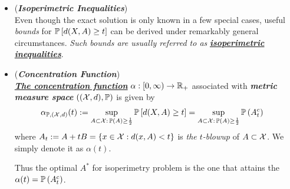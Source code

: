 \documentclass[11pt]{article}
\begin{document}
\begin{itemize}
\item \begin{remark} (\emph{\textbf{Isoperimetric Inequalities}})\\
Even though the exact solution is only known in a few special cases, useful \emph{bounds} for ${\mathbb P}\left[d(X, A) \ge t\right]$ can be derived under remarkably general circumstances. \emph{Such bounds are usually referred to as} \underline{\emph{\textbf{isoperimetric inequalities}}}.
\end{remark}

\item \begin{definition} (\textbf{\emph{Concentration Function}}) \citep{boucheron2013concentration, wainwright2019high}\\
\underline{\emph{\textbf{The concentration function}}} $\alpha: [0, \infty) \to {\mathbb R}_{+}$  associated with \emph{\textbf{metric measure space}} $(({\mathcal X}, d), {\mathbb P})$ is given by
\begin{align*}
\alpha_{{\mathbb P}, ({\mathcal X}, d)}(t) &:= \sup_{ A \subset {\mathcal X}:\, {\mathbb P}\left(A\right) \ge \frac{1}{2}}{\mathbb P}\left[d(X, A) \ge t \right] = \sup_{A \subset {\mathcal X}: \,{\mathbb P}\left(A\right) \ge \frac{1}{2}}{\mathbb P}\left(A_{t}^{c} \right)
\end{align*} where $A_t:= A + tB = \left\{x \in {\mathcal X}: d(x, A) < t\right\}$ is \emph{the $t$-blowup} of $A \subset {\mathcal X}$. We simply denote it as $\alpha(t)$.
\end{definition}
Thus the optimal $A^{*}$ for isoperimetry problem is the one that attains the $\alpha(t) = {\mathbb P}\left(A_{t}^{c} \right)$.


\end{itemize}
\end{document}
